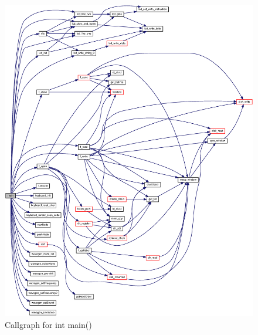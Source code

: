 \documentclass[bibtotocnumbered,abstract=on,paper=a4,fontsize=12pt,parskip=on,halfparskip=on]{scrartcl}		%
\begin{document}
    \begin{figure}[H]
      \centering
        \includegraphics[width=\linewidth]{img/main_8c_ae66f6b31b5ad750f1fe042a706a4e3d4_cgraph.eps}
        \caption{Callgraph for int main()}
    \end{figure}

    \clearpage
\end{document}
